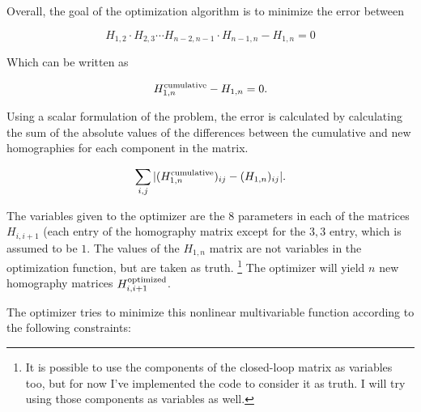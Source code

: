 \documentclass{article}
\begin{document}
Overall, the goal of the optimization algorithm is to minimize the error
between
 
\[H_{1, 2} \cdot H_{2, 3} \cdots H_{n - 2, n - 1} \cdot H_{n - 1, n} - H_{1, n} = 0\]

Which can be written as

\[H_{1, n}^{\textnormal{cumulative}} - H_{1, n} = 0.\]

Using a scalar formulation of the problem, the error is calculated by
calculating the sum of the absolute values of the differences between the
cumulative and new homographies for each component in the matrix.

\[\sum_{i,j} |(H_{1, n}^{\textnormal{cumulative}})_{ij} - (H_{1, n})_{ij}|.\]

The variables given to the optimizer are the $8$ parameters in each of the
matrices $H_{i, i + 1}$ (each entry of the homography matrix except for the $3,
3$ entry, which is assumed to be $1$. The values of the $H_{1, n}$ matrix are
not variables in the optimization function, but are taken as truth.
\footnote{It is possible to use the components of the closed-loop matrix as
variables too, but for now I've implemented the code to consider it as truth. I
will try using those components as variables as well.} The optimizer will yield
$n$ new homography matrices $H_{i, i+1}^{\textnormal{optimized}}$. 

The optimizer tries to minimize this nonlinear multivariable function according
to the following constraints:
\end{document}
